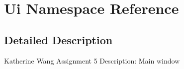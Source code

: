 \hypertarget{namespace_ui}{}\section{Ui Namespace Reference}
\label{namespace_ui}


\subsection{Detailed Description}
Katherine Wang Assignment 5 Description\+: Main window 